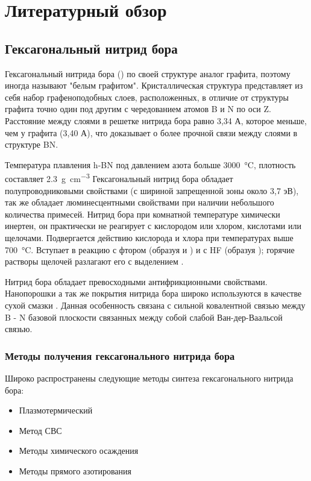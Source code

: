 \chapter{Литературный обзор}%
\label{cha:Литературный обзор}
\section{Гексагональный нитрид бора}%
\label{sec:Гексагональный нитрид бора}

Гексагональный нитрида бора () по своей структуре аналог графита, поэтому
иногда называют "белым графитом". Кристаллическая структура  представляет
из себя набор графеноподобных слоев, расположенных, в отличие от структуры 
графита точно один под другим с чередованием атомов B и N по оси Z. Расстояние 
между слоями в решетке нитрида бора равно 3,34 А, которое меньше, чем у графита
(3,40 А), что доказывает о более прочной связи между слоями в структуре BN.

Температура плавления h-BN под давлением азота больше \SI{3000}{\degreeCelsius}, плотность 
составляет \SI{2.3}{\gram\per\cm^3} Гексагональный нитрид бора обладает 
полупроводниковыми свойствами
(с шириной запрещенной зоны около 3,7 эВ), так же обладает люминесцентными 
свойствами при наличии небольшого количества примесей. Нитрид бора при 
комнатной температуре химически инертен, он практически не реагирует с 
кислородом или хлором, кислотами или щелочами. Подвергается действию кислорода 
и хлора при температурах выше \SI{700}{\degreeCelsius}. 
Вступает в реакцию с фтором (образуя  
и ) и с HF (образуя ); горячие растворы щелочей разлагают его с 
выделением .

Нитрид бора обладает превосходными антифрикционными свойствами. Нанопорошки
а так же покрытия нитрида бора широко используются в качестве сухой смазки \cite[]{_ru__2011}.
Данная особенность связана с сильной ковалентной связью между B - N базовой плоскости 
связанных между собой слабой Ван-дер-Ваальсой связью.

\subsection{Методы получения гексагонального нитрида бора}%
\label{sub:Методы получения гексагонального нитрида бора}


Широко распространены следующие методы синтеза гексагонального нитрида бора:

\begin{itemize}
    \item Плазмотермический
    \item Метод СВС
    \item Методы химического осаждения
    \item Методы прямого азотирования 
\end{itemize}

